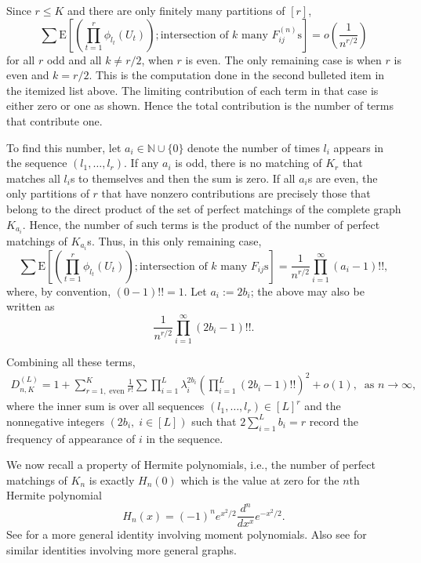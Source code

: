 \documentclass{amsart}
\newcommand{\NN}{\mathbb{N}}
\newcommand{\E}{\mathrm{E}}
\begin{document}
Since $r\le K$ and there are only finitely many partitions of $[r]$, 
\[
\sum \E\left[\left(\prod_{t=1}^r \phi_{l_t}(U_t)\right); \text{intersection of $k$ many $F^{(n)}_{ij}$s} \right]=o\left( \frac{1}{n^{r/2}} \right)
\]
for all $r$ odd and all $k\neq r/2$, when $r$ is even. The only remaining case is when $r$ is even and $k=r/2$. This is the computation done in the second bulleted item in the itemized list above. The limiting contribution of each term in that case is either zero or one as shown. Hence the total contribution is the number of terms that contribute one. 

To find this number, let $a_i\in \NN \cup \{0\}$ denote the number of times $l_i$ appears in the sequence $(l_1, \ldots, l_r)$. If any $a_i$ is odd, there is no matching of $K_r$ that matches all $l_i$s to themselves and then the sum is zero. If all $a_i$s are even, the only partitions of $r$ that have nonzero contributions are precisely those that belong to the direct product of the set of perfect matchings of the complete graph $K_{a_i}$. Hence, the number of such terms is the product of the number of perfect matchings of $K_{a_i}$s. Thus, in this only remaining case, 
\[
\sum \E\left[\left(\prod_{t=1}^r \phi_{l_t}(U_t)\right); \text{intersection of $k$ many $F_{ij}$s} \right]=\frac{1}{n^{r/2}} \prod_{i=1}^\infty (a_i-1)!!,
\]
where, by convention, $(0-1)!!=1$. Let $a_i:=2b_i$; the above may also be written as 
\[
\frac{1}{n^{r/2}} \prod_{i=1}^\infty (2b_i-1)!!.
\]

Combining all these terms, 
\begin{equation}\label{eq:denapprox1}
\begin{split}
    D_{n,K}^{(L)}= 1 +  \sum_{r=1,\; \text{even}}^K \frac{1}{r!}\sum \prod_{i=1}^L \lambda_{i}^{2b_i} \left( \prod_{i=1}^L (2 b_i-1)!!\right)^2 + o(1),\;\; \text{as $n\rightarrow \infty$}, 
\end{split}
\end{equation}
where the inner sum is over all sequences $(l_1, \ldots, l_r)\in [L]^r$ and the nonnegative integers $(2b_i,\; i\in [L])$ such that $2\sum_{i=1}^L b_i=r$ record the frequency of appearance of $i$ in the sequence. 




We now recall a property of Hermite polynomials, i.e., the number of perfect matchings of $K_n$ is exactly $H_n(0)$ which is the value at zero for the $n$th Hermite polynomial
\[
H_n(x)=(-1)^n e^{x^2/2}\frac{d^n}{dx^x} e^{-x^2/2}.
\]
See \cite[eqn. (3.14)]{HL71} for a more general identity involving moment polynomials. Also see \cite{Godsil81} for similar identities involving more general graphs. 
\end{document}
